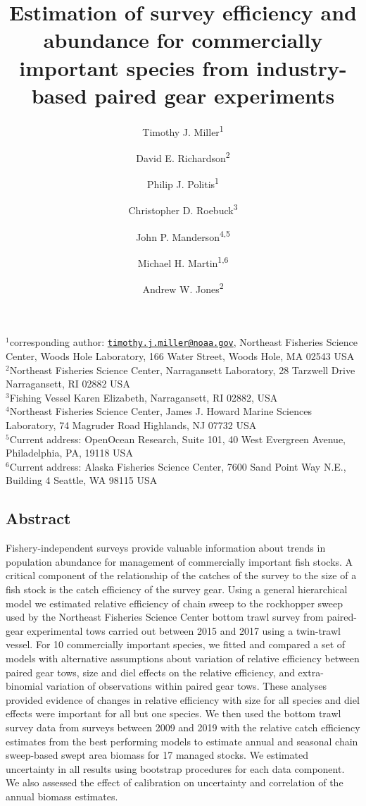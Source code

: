 \documentclass[
  12pt,
]{article}
\title{Estimation of survey efficiency and abundance for commercially
important species from industry-based paired gear experiments}
\author{Timothy J. Miller\textsuperscript{1} \and David E.
Richardson\textsuperscript{2} \and Philip J.
Politis\textsuperscript{1} \and Christopher D.
Roebuck\textsuperscript{3} \and John P.
Manderson\textsuperscript{4,5} \and Michael H.
Martin\textsuperscript{1,6} \and Andrew W. Jones\textsuperscript{2}}
\date{}
\begin{document}
\maketitle

\(^1\)corresponding author:
\href{mailto:timothy.j.miller@noaa.gov}{\nolinkurl{timothy.j.miller@noaa.gov}},
Northeast Fisheries Science Center, Woods Hole Laboratory, 166 Water
Street, Woods Hole, MA 02543 USA\\
\(^2\)Northeast Fisheries Science Center, Narragansett Laboratory, 28
Tarzwell Drive Narragansett, RI 02882 USA\\
\(^3\)Fishing Vessel Karen Elizabeth, Narragansett, RI 02882, USA\\
\(^4\)Northeast Fisheries Science Center, James J. Howard Marine
Sciences Laboratory, 74 Magruder Road Highlands, NJ 07732 USA\\
\(^5\)Current address: OpenOcean Research, Suite 101, 40 West Evergreen
Avenue, Philadelphia, PA, 19118 USA\\
\(^6\)Current address: Alaska Fisheries Science Center, 7600 Sand Point
Way N.E., Building 4 Seattle, WA 98115 USA

\pagebreak

\hypertarget{abstract}{%
\subsection*{Abstract}\label{abstract}}

Fishery-independent surveys provide valuable information about trends in
population abundance for management of commercially important fish
stocks. A critical component of the relationship of the catches of the
survey to the size of a fish stock is the catch efficiency of the survey
gear. Using a general hierarchical model we estimated relative
efficiency of chain sweep to the rockhopper sweep used by the Northeast
Fisheries Science Center bottom trawl survey from paired-gear
experimental tows carried out between 2015 and 2017 using a twin-trawl
vessel. For 10 commercially important species, we fitted and compared a
set of models with alternative assumptions about variation of relative
efficiency between paired gear tows, size and diel effects on the
relative efficiency, and extra-binomial variation of observations within
paired gear tows. These analyses provided evidence of changes in
relative efficiency with size for all species and diel effects were
important for all but one species. We then used the bottom trawl survey
data from surveys between 2009 and 2019 with the relative catch
efficiency estimates from the best performing models to estimate annual
and seasonal chain sweep-based swept area biomass for 17 managed stocks.
We estimated uncertainty in all results using bootstrap procedures for
each data component. We also assessed the effect of calibration on
uncertainty and correlation of the annual biomass estimates.
\end{document}
